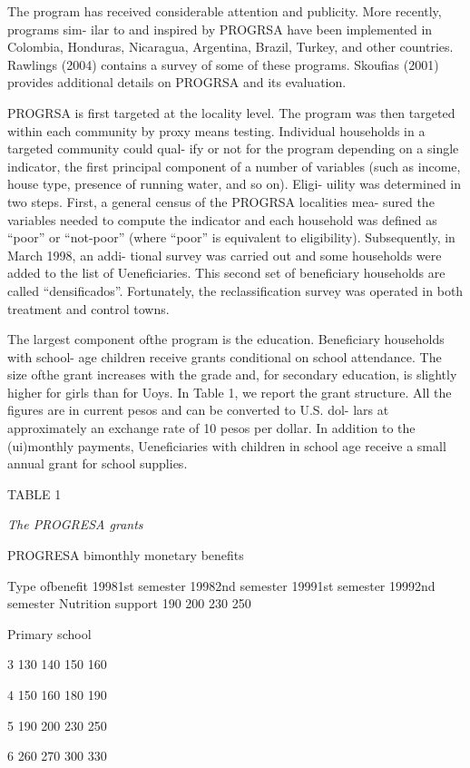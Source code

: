 The program has received considerable attention and publicity. More recently, programs sim- ilar to and inspired by PROGRSA have been implemented in Colombia, Honduras, Nicaragua, Argentina, Brazil, Turkey, and other countries. Rawlings (2004) contains a survey of some of these programs. Skoufias (2001) provides additional details on PROGRSA and its evaluation.

PROGRSA is first targeted at the locality level. The program was then targeted within each community by proxy means testing. Individual households in a targeted community could qual- ify or not for the program depending on a single indicator, the first principal component of a number of variables (such as income, house type, presence of running water, and so on). Eligi- uility was determined in two steps. First, a general census of the PROGRSA localities mea- sured the variables needed to compute the indicator and each household was defined as ``poor'' or ``not-poor'' (where ``poor'' is equivalent to eligibility). Subsequently, in March 1998, an addi- tional survey was carried out and some households were added to the list of Ueneficiaries. This second set of beneficiary households are called ``densificados''. Fortunately, the reclassification survey was operated in both treatment and control towns.

The largest component ofthe program is the education. Beneficiary households with school- age children receive grants conditional on school attendance. The size ofthe grant increases with the grade and, for secondary education, is slightly higher for girls than for Uoys. In Table 1, we report the grant structure. All the figures are in current pesos and can be converted to U.S. dol- lars at approximately an exchange rate of 10 pesos per dollar. In addition to the (ui)monthly payments, Ueneficiaries with children in school age receive a small annual grant for school supplies.

TABLE 1

{\it The PROGRESA grants}

PROGRESA bimonthly monetary benefits

Type ofbenefit 19981st semester 19982nd semester 19991st semester 19992nd semester Nutrition support 190 200 230 250

Primary school

3 130 140 150 160

4 150 160 180 190

5 190 200 230 250

6 260 270 300 330

